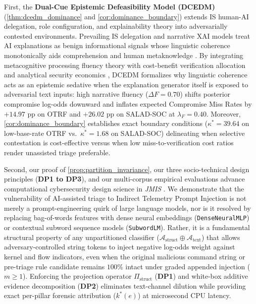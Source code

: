 \documentclass[11pt,a4paper]{article}
\let\oldtexttt\texttt
\renewcommand{\texttt}[1]{\textnormal{\oldtexttt{#1}}}
\begin{document}
First, the \textbf{Dual-Cue Epistemic Defeasibility Model (DCEDM)} (\cref{thm:dcedm_dominance} and \cref{cor:dominance_boundary}) extends IS human-AI delegation, role configuration, and explainability theory \citep{baird2021next, fugener2022cognitive, revilla2023human, tutun2024explainable, ansari2026partner, bag2025enhancing, taudien2026effect} into adversarially contested environments. Prevailing IS delegation and narrative XAI models treat AI explanations as benign informational signals whose linguistic coherence monotonically aids comprehension and human metaknowledge \citep{burton2020systematic, bag2025enhancing, taudien2026effect}. By integrating metacognitive processing fluency theory \citep{alter2009uniting} with cost-benefit verification allocation \citep{vasconcelos2023explanations, bucinca2021trust} and analytical security economics \citep{liu2020centralized, li2021roles}, DCEDM formalizes why linguistic coherence acts as an epistemic sedative when the explanation generator itself is exposed to adversarial text inputs: high narrative fluency ($\Delta F = 0.70$) shifts posterior compromise log-odds downward and inflates expected Compromise Miss Rates by $+14.97\text{ pp}$ on OTRF and $+26.02\text{ pp}$ on SALAD-SOC at $\lambda_F = 0.40$. Moreover, \cref{cor:dominance_boundary} establishes exact boundary conditions ($\kappa^* = 39.64$ on low-base-rate OTRF vs.\ $\kappa^* = 1.68$ on SALAD-SOC) delineating when selective contestation is cost-effective versus when low miss-to-verification cost ratios render unassisted triage preferable.

Second, our proof of \cref{prop:partition_invariance}, our three socio-technical design principles (\textbf{DP1 to DP3}), and our multi-corpus empirical evaluations advance computational cybersecurity design science in \textit{JMIS} \citep{lowry2017security, ebrahimi2020semi, li2022assessing, naseer2023enabling, ampel2024improving, srinivas2025ai}. We demonstrate that the vulnerability of AI-assisted triage to Indirect Telemetry Prompt Injection is not merely a prompt-engineering quirk of large language models, nor is it resolved by replacing bag-of-words features with dense neural embeddings (\texttt{DenseNeuralMLP}) or contextual subword sequence models (\texttt{SubwordLM}). Rather, it is a fundamental structural property of any unpartitioned classifier ($\mathcal{A}_{\text{struct}} \oplus \mathcal{A}_{\text{text}}$) that allows adversary-controlled string tokens to inject negative log-odds weight against kernel and flow indicators, even when the original malicious command string or pre-triage rule candidate remains $100\%$ intact under graded appended injection ($m \ge 1$). Enforcing the projection operator $\Pi_{\text{struct}}$ (\textbf{DP1}) and white-box additive evidence decomposition (\textbf{DP2}) eliminates text-channel dilution while providing exact per-pillar forensic attribution ($k^*(e)$) at microsecond CPU latency.
\end{document}
